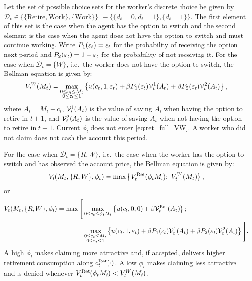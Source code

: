 Let the set of possible choice sets for the worker's discrete choice be given by
$\mathcal{D}_t \in \{\{\text{Retire}, \text{Work}\}, \{\text{Work}\}\}$
$\equiv \{\{d_t = 0, d_t = 1\}, \{d_t = 1\}\}$. The first element of
this set is the case when the agent has the option to switch and the second element is
the case when the agent does not have the option to switch and must continue working.
Write $P_1(\varepsilon_t) = \varepsilon_t$ for the probability of receiving the option next period and
$P_2(\varepsilon_t) = 1 - \varepsilon_t$ for the probability of not receiving it.
For the case when $\mathcal{D}_t = \{W\}$, i.e.\ the worker does not have the option to switch, the
Bellman equation is given by:
\begin{equation}
V_t^{W}(M_t) = \max_{\substack{0 \le c_t \le M_t \\ 0 \le \varepsilon_t \le 1}}
\left\{ u(c_t, 1, \varepsilon_t) + \beta P_1(\varepsilon_t) \mathcal{V}_t^1(A_t) + \beta P_2(\varepsilon_t) \mathcal{V}_t^2(A_t) \right\},
\label{eq:ret_full_VW}
\end{equation}
where $A_t = M_t - c_t$, $\mathcal{V}_t^1(A_t)$ is the value of saving $A_t$ when having the
option to retire in $t + 1$, and $\mathcal{V}_t^2(A_t)$
is the value of saving $A_t$ when not having the option to retire in $t + 1$.
Current $\phi_t$ does not enter
\eqref{eq:ret_full_VW}. A worker who did not claim does not cash the account this period.

For the case when $\mathcal{D}_t = \{R, W\}$, i.e.\ the case when the worker has the option to
switch and has observed the account price, the Bellman equation is given by:
\begin{equation}
V_t(M_t, \{R, W\}, \phi_t) = \max
\left\{ V_t^{\mathrm{Ret}}(\phi_t M_t);\ V_t^{W}(M_t) \right\},
\label{eq:ret_price_discrete}
\end{equation}
or
\begin{equation}
\begin{aligned}
V_t(M_t, \{R, W\}, \phi_t) = \max
\Bigg[
&\max_{0 \le c_t \le \phi_t M_t} \left\{ u(c_t, 0, 0) + \beta \mathcal{V}_t^{\mathrm{Ret}}(A_t) \right\};\\
&\max_{\substack{0 \le c_t \le M_t \\ 0 \le \varepsilon_t \le 1}}
\left\{ u(c_t, 1, \varepsilon_t) + \beta P_1(\varepsilon_t) \mathcal{V}_t^1(A_t) + \beta P_2(\varepsilon_t) \mathcal{V}_t^2(A_t) \right\}
\Bigg].
\end{aligned}
\label{eq:ret_full_discrete}
\end{equation}
A high $\phi_t$ makes claiming more attractive and, if accepted, delivers higher retirement
consumption along $c_t^{\mathrm{Ret}}(\cdot)$. A low $\phi_t$ makes claiming less attractive and is denied
whenever $V_t^{\mathrm{Ret}}(\phi_t M_t) < V_t^{W}(M_t)$.

